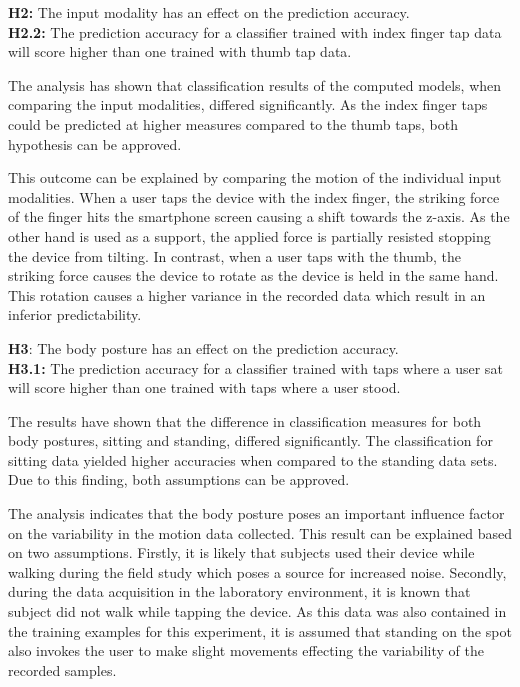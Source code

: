 \begin{center}
  \begin{framed}
    \textbf{H2:} The input modality has an effect on the prediction accuracy.\\
    \textbf{H2.2:} The prediction accuracy for a classifier trained with index finger tap data will score higher than one trained with thumb tap data.
  \end{framed}
\end{center}

The analysis has shown that classification results of the computed models, when comparing the input modalities, differed significantly. As the index finger taps could be predicted at higher measures compared to the thumb taps, both hypothesis can be approved.

This outcome can be explained by comparing the motion of the individual input modalities. When a user taps the device with the index finger, the striking force of the finger hits the smartphone screen causing a shift towards the z-axis. As the other hand is used as a support, the applied force is partially resisted stopping the device from tilting. In contrast, when a user taps with the thumb, the striking force causes the device to rotate as the device is held in the same hand. This rotation causes a higher variance in the recorded data which result in an inferior predictability.



\begin{center}
  \begin{framed}
    \textbf{H3}: The body posture has an effect on the prediction accuracy.\\
    \textbf{H3.1:} The prediction accuracy for a classifier trained with taps where a user sat will score higher than one trained with taps where a user stood.
  \end{framed}
\end{center}

The results have shown that the difference in classification measures for both body postures, sitting and standing, differed significantly. The classification for sitting data yielded higher accuracies when compared to the standing data sets. Due to this finding, both assumptions can be approved.

The analysis indicates that the body posture poses an important influence factor on the variability in the motion data collected. This result can be explained based on two assumptions. Firstly, it is likely that subjects used their device while walking during the field study which poses a source for increased noise. Secondly, during the data acquisition in the laboratory environment, it is known that subject did not walk while tapping the device. As this data was also contained in the training examples for this experiment, it is assumed that standing on the spot also invokes the user to make slight movements effecting the variability of the recorded samples.

